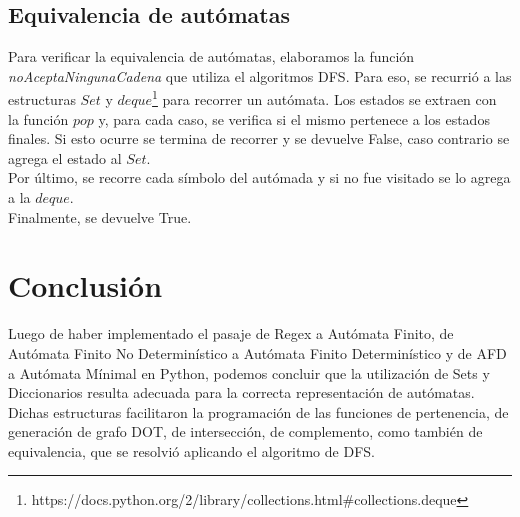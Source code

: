 \documentclass[a4paper, 10pt, twoside]{article}
\begin{document}
\subsection{Equivalencia de autómatas}
Para verificar la equivalencia de autómatas, elaboramos la función \textit{noAceptaNingunaCadena} que utiliza el algoritmos DFS. Para eso, se recurrió a las estructuras $Set$ y $deque$\footnote{https://docs.python.org/2/library/collections.html\#collections.deque} para recorrer un autómata. Los estados se extraen con la función $pop$ y, para cada caso, se verifica si el mismo pertenece a los estados finales. Si esto ocurre se termina de recorrer y se devuelve False, caso contrario se agrega el estado al $Set$.\\
Por último, se recorre cada símbolo del autómada y si no fue visitado se lo agrega a la $deque$.\\
Finalmente, se devuelve True.

\newpage
\section{Conclusión}
Luego de haber implementado el pasaje de Regex a Autómata Finito, de Autómata Finito No Determinístico a Autómata Finito Determinístico y de AFD a Autómata Mínimal en Python, podemos concluir que la utilización de Sets y Diccionarios resulta adecuada para la correcta representación de autómatas. Dichas estructuras facilitaron la programación de las funciones de pertenencia, de generación de grafo DOT, de intersección, de complemento, como también de equivalencia, que se resolvió aplicando el algoritmo de DFS.
\end{document}

